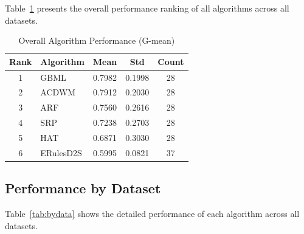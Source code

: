 \documentclass[conference]{IEEEtran}
\begin{document}
Table~\ref{tab:overall} presents the overall performance ranking of all algorithms across all datasets.


\begin{table}[htbp]
\caption{Overall Algorithm Performance (G-mean)}
\label{tab:overall}
\centering
\begin{tabular}{clccc}
\toprule
\textbf{Rank} & \textbf{Algorithm} & \textbf{Mean} & \textbf{Std} & \textbf{Count} \\
\midrule
1 & GBML & 0.7982 & 0.1998 & 28 \\
2 & ACDWM & 0.7912 & 0.2030 & 28 \\
3 & ARF & 0.7560 & 0.2616 & 28 \\
4 & SRP & 0.7238 & 0.2703 & 28 \\
5 & HAT & 0.6871 & 0.3030 & 28 \\
6 & ERulesD2S & 0.5995 & 0.0821 & 37 \\
\bottomrule
\end{tabular}
\end{table}


\subsection{Performance by Dataset}

Table~\ref{tab:bydata} shows the detailed performance of each algorithm across all datasets.
\end{document}
